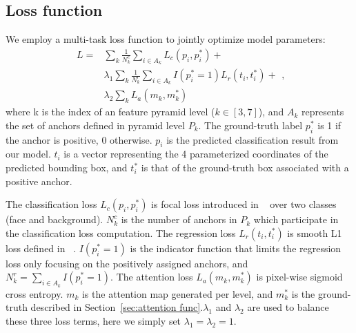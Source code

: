 \documentclass[10pt,twocolumn,letterpaper]{article}
\begin{document}
\subsection{Loss function}\label{sec:training}





We employ a multi-task loss function to jointly optimize model parameters:
\begin{equation}
\begin{aligned} L=&\sum_k{\frac{1}{N_k^c}\sum_{i\in A_k}{L_c(p_i, p_i^*)}}+\\
&\lambda_1\sum_k{\frac{1}{N_k^r}\sum_{i\in A_k}{I(p_i^*=1)L_r(t_i, t_i^*)}}+\\
&\lambda_2\sum_k{L_a(m_k, m_k^*)} \end{aligned},
\end{equation}
where k is the index of an feature pyramid level ($ k\in[3, 7] $), and $ A_k $ represents the set of anchors defined in pyramid level $ P_k $. The ground-truth label $ p_i^* $ is 1 if the anchor is positive, 0 otherwise. $ p_i$ is the predicted classification result from our model. $ t_i $ is a vector representing the 4 parameterized coordinates of the predicted bounding box, and $ t_i^* $ is that of the ground-truth box associated with a positive anchor. 

The classification loss $ L_c(p_i, p_i^*) $ is focal loss introduced in ~\cite{lin2017focal} over two classes (face and background). $ N_k^c $ is the number of anchors in $ P_k $ which participate in the classification loss computation. The regression loss $ L_r(t_i, t_i^*) $ is smooth L1 loss defined in ~\cite{girshick2015fast}. $ I(p_i^*=1) $ is the indicator function that limits the regression loss only focusing on the positively assigned anchors, and $ N_k^r=\sum_{i\in A_k}{I(p_i^*=1)} $. The attention loss $ L_a(m_k, m_k^*) $ is pixel-wise sigmoid cross entropy. $ m_k $ is the attention map generated per level, and $ m_k^* $ is the ground-truth described in Section~\ref{sec:attention func}.$ \lambda_1 $ and $ \lambda_2 $ are used to balance these three loss terms, here we simply set $ \lambda_1=\lambda_2=1 $.
\end{document}
